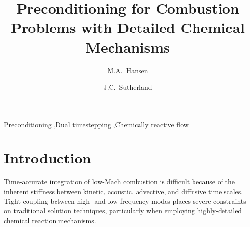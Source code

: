 \documentclass[final,3p,times,twocolumn]{elsarticle}
\begin{document}
\begin{frontmatter}
\title{Preconditioning for Combustion Problems with Detailed Chemical Mechanisms}

\author[uofu]{M.A.~Hansen}

\author[uofu]{J.C.~Sutherland}

\address[uofu]{University of Utah, Department of Chemical Engineering, 201
President's Circle, Salt Lake City, UT 84112}

\begin{abstract}
\blindtext
\end{abstract}

\begin{keyword}
Preconditioning \sep Dual timestepping \sep Chemically reactive flow
\end{keyword}
\end{frontmatter}

\section{Introduction}
% 
% 
%
Time-accurate integration of low-Mach combustion is difficult because of
the inherent stiffness between kinetic, acoustic, advective, and diffusive time
scales. Tight coupling between high- and low-frequency modes places severe
constraints on traditional solution techniques, particularly when employing
highly-detailed chemical reaction mechanisms. 
\end{document}
